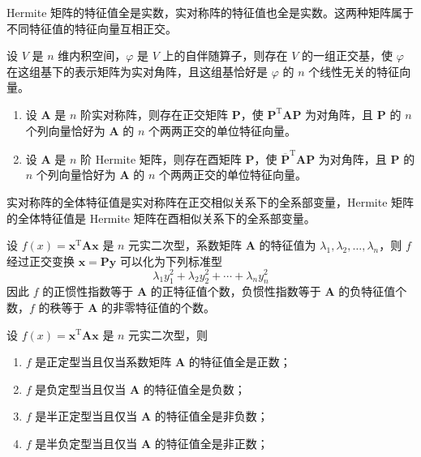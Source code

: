 \begin{corollary}
    Hermite 矩阵的特征值全是实数，实对称阵的特征值也全是实数。这两种矩阵属于不同特征值的特征向量互相正交。
\end{corollary}

\begin{theorem}
    设 $V$ 是 $n$ 维内积空间，$\varphi$ 是 $V$ 上的自伴随算子，则存在 $V$ 的一组正交基，使 $\varphi$ 在这组基下的表示矩阵为实对角阵，且这组基恰好是 $\varphi$ 的 $n$ 个线性无关的特征向量。
\end{theorem}

\begin{theorem}
    \begin{enumerate}
        \item 设 $\bm{A}$ 是 $n$ 阶实对称阵，则存在正交矩阵 $\bm{P}$，使 $\bm{P}^{\mathrm{T}}\bm{AP}$ 为对角阵，且 $\bm{P}$ 的 $n$ 个列向量恰好为 $\bm{A}$ 的 $n$ 个两两正交的单位特征向量。
        \item 设 $\bm{A}$ 是 $n$ 阶 Hermite 矩阵，则存在酉矩阵 $\bm{P}$，使 $\overline{\bm{P}}^{\mathrm{T}}\bm{AP}$ 为对角阵，且 $\bm{P}$ 的 $n$ 个列向量恰好为 $\bm{A}$ 的 $n$ 个两两正交的单位特征向量。
    \end{enumerate}
\end{theorem}

\begin{corollary}
    实对称阵的全体特征值是实对称阵在正交相似关系下的全系部变量，Hermite 矩阵的全体特征值是 Hermite 矩阵在酉相似关系下的全系部变量。
\end{corollary}

\begin{theorem}
    设 $f(x) = \bm{x}^{\mathrm{T}}\bm{Ax}$ 是 $n$ 元实二次型，系数矩阵 $\bm{A}$ 的特征值为 $\lambda_1, \lambda_2, \ldots, \lambda_n$，则 $f$ 经过正交变换 $\bm{x} = \bm{Py}$ 可以化为下列标准型
    \[
        \lambda_{1}y_{1}^{2} + \lambda_{2}y_{2}^{2} + \cdots + \lambda_{n}y_{n}^{2}
    \]
    因此 $f$ 的正惯性指数等于 $\bm{A}$ 的正特征值个数，负惯性指数等于 $\bm{A}$ 的负特征值个数，$f$ 的秩等于 $\bm{A}$ 的非零特征值的个数。
\end{theorem}

\begin{corollary}
    设 $f(x) = \bm{x}^{\mathrm{T}}\bm{Ax}$ 是 $n$ 元实二次型，则
    \begin{enumerate}
        \item $f$ 是正定型当且仅当系数矩阵 $\bm{A}$ 的特征值全是正数；
        \item $f$ 是负定型当且仅当 $\bm{A}$ 的特征值全是负数；
        \item $f$ 是半正定型当且仅当 $\bm{A}$ 的特征值全是非负数；
        \item $f$ 是半负定型当且仅当 $\bm{A}$ 的特征值全是非正数；
    \end{enumerate}

\end{corollary}

